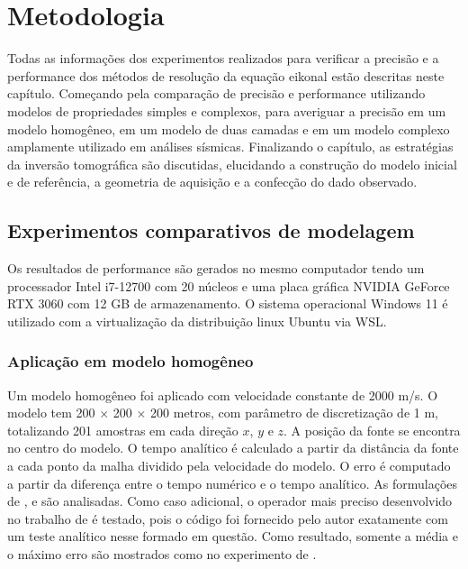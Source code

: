 \chapter{Metodologia}
\label{ch:metodologia}

Todas as informações dos experimentos realizados para verificar a precisão e a performance dos métodos de resolução da equação eikonal estão descritas neste capítulo. Começando pela comparação de precisão e performance utilizando modelos de propriedades simples e complexos, para averiguar a precisão em um modelo homogêneo, em um modelo de duas camadas e em um modelo complexo amplamente utilizado em análises sísmicas. Finalizando o capítulo, as estratégias da inversão tomográfica são discutidas, elucidando a construção do modelo inicial e de referência, a geometria de aquisição e a confecção do dado observado.

\section{Experimentos comparativos de modelagem}

Os resultados de performance são gerados no mesmo computador tendo um processador Intel i7-12700 com 20 núcleos e uma placa gráfica NVIDIA GeForce RTX 3060 com 12 GB de armazenamento. O sistema operacional Windows 11 é utilizado com a virtualização da distribuição linux Ubuntu via WSL.  

\subsection{Aplicação em modelo homogêneo}

Um modelo homogêneo foi aplicado com velocidade constante de 2000 m/s. O modelo tem 200 $\times$ 200 $\times$ 200 metros, com parâmetro de discretização de 1 m, totalizando 201 amostras em cada direção $x$, $y$ e $z$. A posição da fonte se encontra no centro do modelo. O tempo analítico é calculado a partir da distância da fonte a cada ponto da malha dividido pela velocidade do modelo. O erro é computado a partir da diferença entre o tempo numérico e o tempo analítico. As formulações de ,  e  são analisadas. Como caso adicional, o operador mais preciso desenvolvido no trabalho de  é testado, pois o código foi fornecido pelo autor exatamente com um teste analítico nesse formado em questão. Como resultado, somente a média e o máximo erro são mostrados como no experimento de . 

